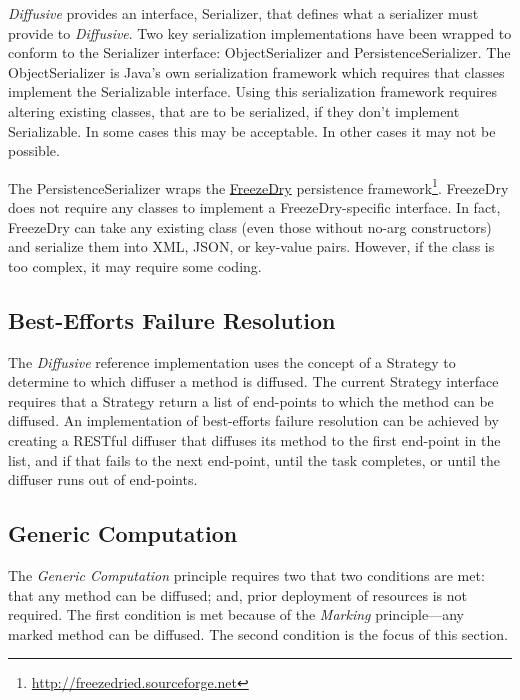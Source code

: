 \documentclass[11pt]{scrartcl}
\begin{document}
\emph{Diffusive} provides an interface, \textsf{Serializer}, that defines what a serializer must provide to \emph{Diffusive}. Two key serialization implementations have been wrapped to conform to the \textsf{Serializer} interface: \textsf{ObjectSerializer} and \textsf{PersistenceSerializer}. The \textsf{ObjectSerializer} is Java's own serialization framework which requires that classes implement the \textsf{Serializable} interface. Using this serialization framework requires altering existing classes, that are to be serialized, if they don't implement \textsf{Serializable}. In some cases this may be acceptable. In other cases it may not be possible.

The \textsf{PersistenceSerializer} wraps the \href{http://freezedried.sourceforge.net}{FreezeDry} persistence framework\footnote{\url{http://freezedried.sourceforge.net}}. FreezeDry does not require any classes to implement a FreezeDry-specific interface. In fact, FreezeDry can take any existing class (even those without no-arg constructors) and serialize them into XML, JSON, or key-value pairs. However, if the class is too complex, it may require some coding.

\subsection{Best-Efforts Failure Resolution\label{sec:best_efforts_failure_resolution_ref_impl}}
The \emph{Diffusive} reference implementation uses the concept of a \textsf{Strategy} to determine to which diffuser a method is diffused. The current \textsf{Strategy} interface requires that a \textsf{Strategy} return a list of end-points to which the method can be diffused. An implementation of best-efforts failure resolution can be achieved by creating a RESTful diffuser that diffuses its method to the first end-point in the list, and if that fails to the next end-point, until the task completes, or until the diffuser runs out of end-points.

\subsection{Generic Computation\label{sec:generic_computation}}
The \emph{Generic Computation} principle requires two that two conditions are met: that any method can be diffused; and, prior deployment of resources is not required. The first condition is met because of the \emph{Marking} principle---any marked method can be diffused. The second condition is the focus of this section.
\end{document}
